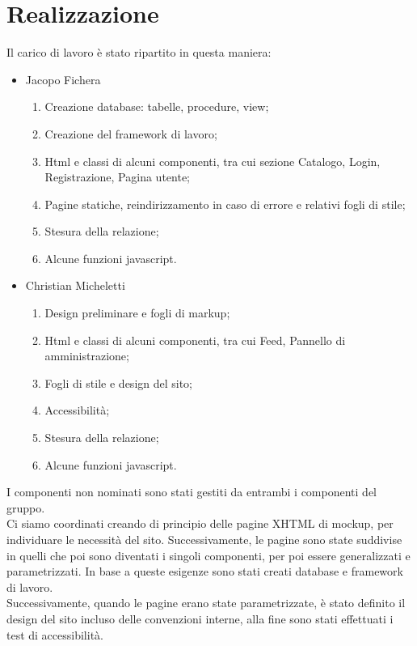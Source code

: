 \documentclass[12pt, a4paper]{article}
\begin{document}
    \section{Realizzazione}
    Il carico di lavoro è stato ripartito in questa maniera:
    \begin{itemize}
        \item Jacopo Fichera
        \begin{enumerate}
            \item Creazione database: tabelle, procedure, view;
            \item Creazione del framework di lavoro;
            \item Html e classi di alcuni componenti, tra cui sezione Catalogo, Login, Registrazione, Pagina utente;
            \item Pagine statiche, reindirizzamento in caso di errore e relativi fogli di stile;
            \item Stesura della relazione;
            \item Alcune funzioni javascript.
        \end{enumerate}
        \item Christian Micheletti
        \begin{enumerate}
            \item Design preliminare e fogli di markup;
            \item Html e classi di alcuni componenti, tra cui Feed, Pannello di amministrazione;
            \item Fogli di stile e design del sito;
            \item Accessibilità;
            \item Stesura della relazione;
            \item Alcune funzioni javascript.
        \end{enumerate}
    \end{itemize}
    I componenti non nominati sono stati gestiti da entrambi i componenti del gruppo. \\
    Ci siamo coordinati creando di principio delle pagine XHTML di mockup, per individuare le necessità del sito. Successivamente, le pagine sono state suddivise in quelli che poi sono diventati i singoli componenti, per poi essere generalizzati e parametrizzati. In base a queste esigenze sono stati creati database e framework di lavoro. \\
    Successivamente, quando le pagine erano state parametrizzate, è stato definito il design del sito incluso delle convenzioni interne, alla fine sono stati effettuati i test di accessibilità.
\end{document}
